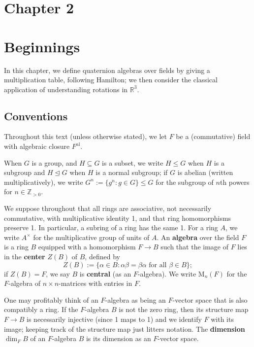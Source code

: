\documentclass{article}
\theoremstyle{definition}
\begin{document}
\section*{Chapter 2}
\section{Beginnings}

In this chapter, we define quaternion algebras over fields by giving a multiplication table, following Hamilton; we then consider the classical application of understanding rotations in $\mathbb{R}^3$.

\subsection{Conventions}

Throughout this text (unless otherwise stated), we let $F$ be a (commutative) field with algebraic closure $F^{\text{al}}$.

When $G$ is a group, and $H \subseteq G$ is a subset, we write $H \leq G$ when $H$ is a subgroup and $H \trianglelefteq G$ when $H$ is a normal subgroup; if $G$ is abelian (written multiplicatively), we write $G^n := \{g^n : g \in G\} \leq G$ for the subgroup of $n$th powers for $n \in \mathbb{Z}_{>0}$.

We suppose throughout that all rings are associative, not necessarily commutative, with multiplicative identity 1, and that ring homomorphisms preserve 1. In particular, a subring of a ring has the same 1. For a ring $A$, we write $A^\times$ for the multiplicative group of units of $A$. An \textbf{algebra} over the field $F$ is a ring $B$ equipped with a homomorphism $F \to B$ such that the image of $F$ lies in the \textbf{center} $Z(B)$ of $B$, defined by
$$Z(B) := \{\alpha \in B : \alpha\beta = \beta\alpha \text{ for all } \beta \in B\}; \tag{2.1.1}$$
if $Z(B) = F$, we say $B$ is \textbf{central} (as an $F$-algebra). We write $\mathrm{M}_n(F)$ for the $F$-algebra of $n \times n$-matrices with entries in $F$.

One may profitably think of an $F$-algebra as being an $F$-vector space that is also compatibly a ring. If the $F$-algebra $B$ is not the zero ring, then its structure map $F \to B$ is necessarily injective (since 1 maps to 1) and we identify $F$ with its image; keeping track of the structure map just litters notation. The \textbf{dimension} $\dim_F B$ of an $F$-algebra $B$ is its dimension as an $F$-vector space.
\end{document}

